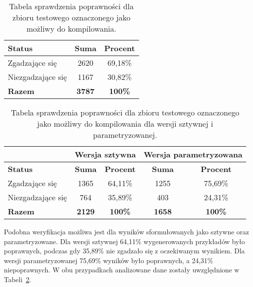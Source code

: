 \begin{table}[H]
\caption{Tabela sprawdzenia poprawności dla zbioru testowego oznaczonego jako możliwy do kompilowania.}\label{tab:tabela7}
\centering%
\begin{tabular}{|l|c|c|}
\hline
\textbf{Status} & \textbf{Suma} & \textbf{Procent} \\
\hline
Zgadzające się & 2620 & 69,18\% \\
\hline
Niezgadzające się & 1167 & 30,82\% \\
\hline
\textbf{Razem} & \textbf{3787} & \textbf{100\%} \\
\hline
\end{tabular}
\end{table}

\begin{table}[H]
\caption{Tabela sprawdzenia poprawności dla zbioru testowego oznaczonego jako możliwy do kompilowania dla wersji sztywnej i parametryzowanej.}\label{tab:experiment:combined_check}
\centering%
\begin{tabular}{|l|c|c|c|c|}
\hline
 & \multicolumn{2}{c|}{\textbf{Wersja sztywna}} & \multicolumn{2}{c|}{\textbf{Wersja parametryzowana}} \\
\hline
\textbf{Status} & \textbf{Suma} & \textbf{Procent} & \textbf{Suma} & \textbf{Procent} \\
\hline
Zgadzające się & 1365 & 64,11\% & 1255 & 75,69\% \\
\hline
Niezgadzające się & 764 & 35,89\% & 403 & 24,31\% \\
\hline
\textbf{Razem} & \textbf{2129} & \textbf{100\%} & \textbf{1658} & \textbf{100\%} \\
\hline
\end{tabular}
\end{table}

Podobna weryfikacja możliwa jest dla wyników sformułowanych jako sztywne oraz parametryzowane. Dla wersji sztywnej 64,11\% wygenerowanych przykładów było poprawnych, podczas gdy 35,89\% nie zgadzało się z oczekiwanym wynikiem. Dla wersji parametryzowanej 75,69\% wyników było poprawnych, a 24,31\% niepoprawnych. W obu przypadkach analizowane dane zostały uwzględnione w Tabeli~\ref{tab:experiment:combined_check}.


